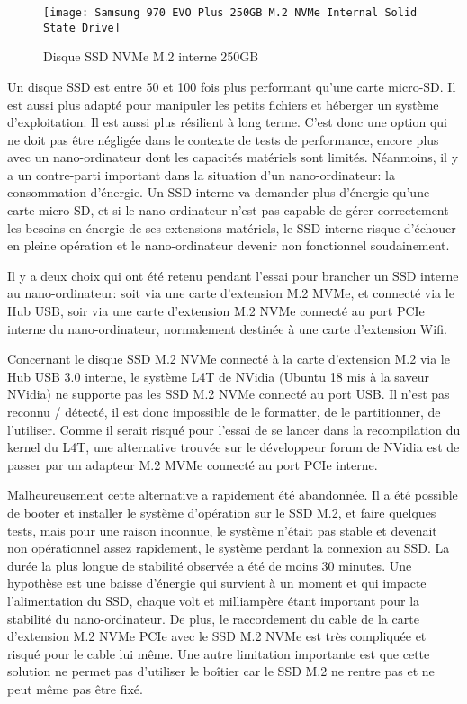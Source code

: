 \begin{figure}
    \centering
    \texttt{[image: Samsung 970 EVO Plus 250GB M.2 NVMe Internal Solid State Drive]}
    \caption{Disque SSD NVMe M.2 interne 250GB}
    \label{fig:disquessd}
\end{figure}
\par Un disque SSD est entre 50 et 100 fois plus performant qu'une carte micro-SD. Il est aussi plus adapté pour manipuler les petits fichiers et héberger un système d'exploitation. Il est aussi plus résilient à long terme. C'est donc une option qui ne doit pas être négligée dans le contexte de tests de performance, encore plus avec un nano-ordinateur dont les capacités matériels sont limités. Néanmoins, il y a un contre-parti important dans la situation d'un nano-ordinateur: la consommation d'énergie. Un SSD interne va demander plus d'énergie qu'une carte micro-SD, et si le nano-ordinateur n'est pas capable de gérer correctement les besoins en énergie de ses extensions matériels, le SSD interne risque d'échouer en pleine opération et le nano-ordinateur devenir non fonctionnel soudainement.
\par Il y a deux choix qui ont été retenu pendant l'essai pour brancher un SSD interne au nano-ordinateur: soit via une carte d'extension M.2 MVMe, et connecté via le Hub USB, soir via une carte d'extension M.2 NVMe connecté au port PCIe interne du nano-ordinateur, normalement destinée à une carte d'extension Wifi.
\par Concernant le disque SSD M.2 NVMe connecté à la carte d'extension M.2 via le Hub USB 3.0 interne, le système L4T de NVidia (Ubuntu 18 mis à la saveur NVidia) ne supporte pas les SSD M.2 NVMe connecté au port USB. Il n'est pas reconnu / détecté, il est donc impossible de le formatter, de le partitionner, de l'utiliser. Comme il serait risqué pour l'essai de se lancer dans la recompilation du kernel du L4T, une alternative trouvée sur le développeur forum de NVidia est de passer par un adapteur M.2 MVMe connecté au port PCIe interne.
\par Malheureusement cette alternative a rapidement été abandonnée. Il a été possible de booter et installer le système d'opération sur le SSD M.2, et faire quelques tests, mais pour une raison inconnue, le système n'était pas stable et devenait non opérationnel assez rapidement, le système perdant la connexion au SSD. La durée la plus longue de stabilité observée a été de moins 30 minutes. Une hypothèse est une baisse d'énergie qui survient à un moment et qui impacte l'alimentation du SSD, chaque volt et milliampère étant important pour la stabilité du nano-ordinateur. De plus, le raccordement du cable de la carte d'extension M.2 NVMe PCIe avec le SSD M.2 NVMe est très compliquée et risqué pour le cable lui même. Une autre limitation importante est que cette solution ne permet pas d'utiliser le boîtier car le SSD M.2 ne rentre pas et ne peut même pas être fixé. 
